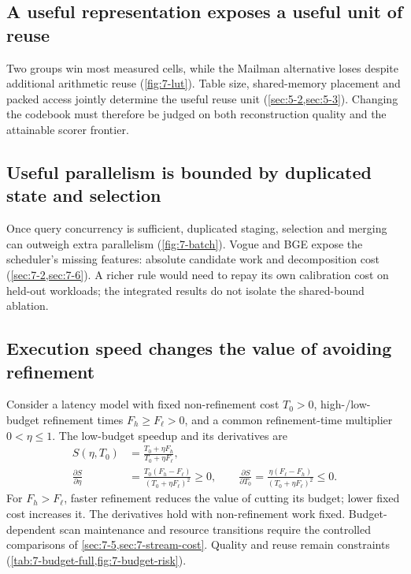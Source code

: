 \subsection{A useful representation exposes a useful unit of reuse}

Two groups win most measured cells, while the Mailman alternative loses
despite additional arithmetic reuse (\cref{fig:7-lut}). Table size,
shared-memory placement and packed access jointly determine the useful
reuse unit (\cref{sec:5-2,sec:5-3}). Changing the codebook must therefore
be judged on both reconstruction quality and the attainable scorer
frontier.

\subsection{Useful parallelism is bounded by duplicated state and selection}

Once query concurrency is sufficient, duplicated staging, selection and
merging can outweigh extra parallelism (\cref{fig:7-batch}).
Vogue and BGE expose the scheduler's missing features: absolute candidate
work and decomposition cost (\cref{sec:7-2,sec:7-6}). A richer rule would
need to repay its own calibration cost on held-out workloads; the
integrated results do not isolate the shared-bound ablation.

\subsection{Execution speed changes the value of avoiding refinement}

Consider a latency model with fixed non-refinement cost $T_0>0$,
high-/low-budget refinement times $F_h\geq F_\ell>0$, and a common
refinement-time multiplier $0<\eta\leq1$. The low-budget speedup and
its derivatives are
\begin{align}
 S(\eta,T_0)&=\frac{T_0+\eta F_h}{T_0+\eta F_\ell},
 \label{eq:8-refinement-sensitivity}\\
 \frac{\partial S}{\partial\eta}
 &=\frac{T_0(F_h-F_\ell)}{(T_0+\eta F_\ell)^2}\geq0,\qquad
 \frac{\partial S}{\partial T_0}
 =\frac{\eta(F_\ell-F_h)}{(T_0+\eta F_\ell)^2}\leq0.\nonumber
\end{align}
For $F_h>F_\ell$, faster refinement reduces the value of cutting its
budget; lower fixed cost increases it. The derivatives hold with
non-refinement work fixed. Budget-dependent scan maintenance and
resource transitions require the controlled comparisons of
\cref{sec:7-5,sec:7-stream-cost}. Quality and reuse remain constraints
(\cref{tab:7-budget-full,fig:7-budget-risk}).

